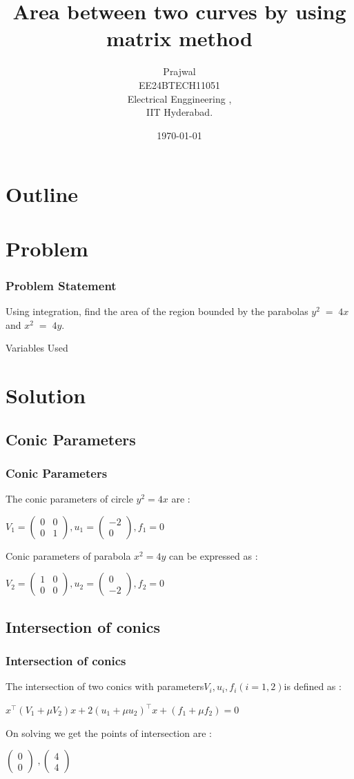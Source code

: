 \documentclass{beamer}
\title{Area between two curves by using matrix method}
\author{Prajwal \\EE24BTECH11051 \\ Electrical Enggineering ,\\IIT Hyderabad.}
\date{\today}
\theoremstyle{remark}
\newcommand{\myvec}[1]{\ensuremath{\begin{pmatrix}#1\end{pmatrix}}}
\numberwithin{equation}{section}
\begin{document}
 

\begin{frame}
\titlepage
\end{frame}

\section*{Outline}
\begin{frame}
\tableofcontents
\end{frame}
\section{Problem}
\begin{frame}
\frametitle{Problem Statement}

Using integration, find the area of the region bounded by the parabolas $y^2\;=\;4x$ and  $x^2\;=\;4y$.
\\ \begin{table}[h!]    
  \centering
  
  \caption{Variables Used}
\end{table}
\end{frame}
\section{Solution}
\subsection{Conic Parameters}
\begin{frame}
\frametitle{Conic Parameters}
 The conic parameters of circle $y^2=4x$ are :
 \begin{center}
      $V_1 = \myvec{ 0 &0\\ 0 &1}, u_1 =\myvec{-2 \\ 0}, f_1 = 0 $
 \end{center}
 Conic parameters of parabola $x^2=4y$ can be expressed as :
 \begin{center}
      $V_2 = \myvec{ 1 &0\\ 0 &0}, u_2 =\myvec{0 \\ -2}, f_2 = 0$
 \end{center}
 
\end{frame}
\subsection{Intersection of conics}
\begin{frame}
\frametitle{Intersection of conics}
The intersection of two conics with parameters$ V_i, u_i, f_i (i = 1, 2) $is defined as :
\begin{center}
    $x^\top (V_1 + \mu V_2) x + 2(u_1 + \mu u_2)^\top x + (f_1 + \mu f_2) = 0$
\end{center}
On solving we get the points of intersection are :
\begin{center}
    $\myvec{0\\0}\;,\myvec{4\\4}$
\end{center}
\end{frame}
\end{document}
